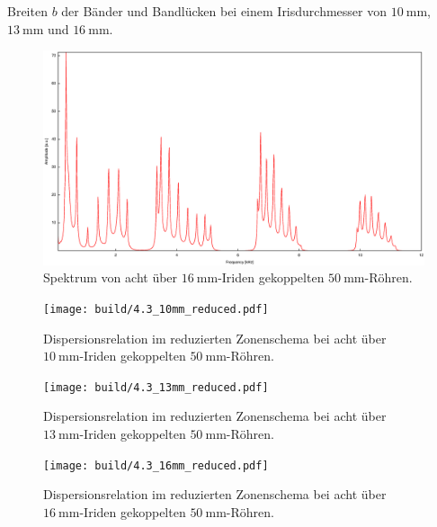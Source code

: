 \begin{table}
\caption{Breiten $b$ der Bänder und Bandlücken bei einem Irisdurchmesser von $\SI{10}{\milli\metre}$, $\SI{13}{\milli\metre}$ und $\SI{16}{\milli\metre}$.}
\centering

\label{tab:band}
\end{table}

\begin{figure}
\centering
\includegraphics[width=\linewidth-60pt,height=\textheight-60pt,keepaspectratio]{FP-V23data/4.3_400mm_16mm.eps}
\caption{Spektrum von acht über $\SI{16}{\milli\meter}$-Iriden gekoppelten $\SI{50}{\milli\meter}$-Röhren.}
\label{fig:8_50_16}
\end{figure}

\begin{figure}
\centering
\texttt{[image: build/4.3\_10mm\_reduced.pdf]}
\caption{Dispersionsrelation im reduzierten Zonenschema bei acht über $\SI{10}{\milli\meter}$-Iriden gekoppelten $\SI{50}{\milli\meter}$-Röhren.}
\label{fig:w_k_1}
\end{figure}

\begin{figure}
\centering
\texttt{[image: build/4.3\_13mm\_reduced.pdf]}
\caption{Dispersionsrelation im reduzierten Zonenschema bei acht über $\SI{13}{\milli\meter}$-Iriden gekoppelten $\SI{50}{\milli\meter}$-Röhren.}
\label{fig:w_k_2}
\end{figure}

\begin{figure}
\centering
\texttt{[image: build/4.3\_16mm\_reduced.pdf]}
\caption{Dispersionsrelation im reduzierten Zonenschema bei acht über $\SI{16}{\milli\meter}$-Iriden gekoppelten $\SI{50}{\milli\meter}$-Röhren.}
\label{fig:w_k_3}
\end{figure}

